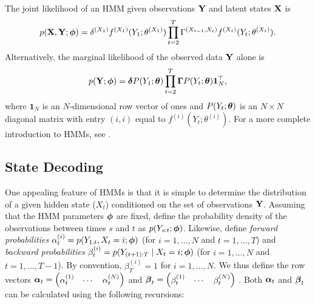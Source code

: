 The joint likelihood of an HMM given observations $\mathbf{Y}$ and latent states $\mathbf{X}$ is
%
\begin{equation}
    p(\mathbf{X},\mathbf{Y};\boldsymbol{\phi}) = \delta^{(X_1)} f^{(X_1)}(Y_1; \theta^{(X_1)}) \prod_{t=2}^T \Gamma^{(X_{t-1},X_t)} f^{(X_t)}(Y_t; \theta^{(X_t)}).
    \label{eqn:like}
\end{equation}
%
Alternatively, the marginal likelihood of the observed data $\mathbf{Y}$ alone is 
%
\begin{equation}
    p(\mathbf{Y};\boldsymbol{\phi}) = \boldsymbol{\delta} P(Y_1;\boldsymbol{\theta}) \prod_{t=2}^T \boldsymbol{\Gamma} P(Y_t;\boldsymbol{\theta}) \mathbf{1}^\top_N,
    \label{eqn:like_marginal}
\end{equation}
%
where $\mathbf{1}_N$ is an $N$-dimensional row vector of ones and $P(Y_t;\boldsymbol{\theta})$ is an $N \times N$ diagonal matrix with entry $(i,i)$ equal to $f^{(i)}(Y_t; \theta^{(i)})$. For a more complete introduction to HMMs, see \citet{Zucchini:2016}.
%
\subsection{State Decoding}

One appealing feature of HMMs is that it is simple to determine the distribution of a given hidden state ($X_t$) conditioned on the set of observations $\mathbf{Y}$. Assuming that the HMM parameters $\boldsymbol{\phi}$ are fixed, define the probability density of the observations between times $s$ and $t$ as $p(Y_{s:t};\boldsymbol{\phi})$. Likewise, define \textit{forward probabilities} $\alpha^{(i)}_t = p(Y_{1:t},X_t = i;\boldsymbol{\phi})$ (for $i = 1,\ldots,N$ and $t = 1,\ldots,T$) and \textit{backward probabilities} $\beta^{(i)}_t = p(Y_{(t+1):T} \mid X_t = i;\boldsymbol{\phi})$ (for $i = 1,\ldots,N$ and $t = 1,\ldots,T-1$). By convention, $\beta^{(i)}_T = 1$ for $i = 1,\ldots,N$. We thus define the row vectors $\boldsymbol{\alpha}_t = \begin{pmatrix} \alpha_t^{(1)} & \cdots & \alpha_t^{(N)} \end{pmatrix}$ and $\boldsymbol{\beta}_t = \begin{pmatrix} \beta_t^{(1)} & \cdots & \beta_t^{(N)} \end{pmatrix}$ . Both $\boldsymbol{\alpha}_t$ and $\boldsymbol{\beta}_t$ can be calculated using the following recursions: %

